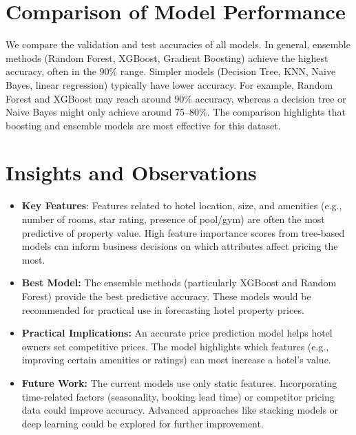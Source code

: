 \documentclass[12pt]{article}
\begin{document}
\section{Comparison of Model Performance}
We compare the validation and test accuracies of all models. In general, ensemble methods (Random Forest, XGBoost, Gradient Boosting) achieve the highest accuracy, often in the 90\% range. Simpler models (Decision Tree, KNN, Naive Bayes, linear regression) typically have lower accuracy. For example, Random Forest and XGBoost may reach around 90\% accuracy, whereas a decision tree or Naive Bayes might only achieve around 75--80\%. The comparison highlights that boosting and ensemble models are most effective for this dataset.


\section{Insights and Observations}
\begin{itemize}
    \item \textbf{Key Features}: Features related to hotel location, size, and amenities (e.g., number of rooms, star rating, presence of pool/gym) are often the most predictive of property value. High feature importance scores from tree-based models can inform business decisions on which attributes affect pricing the most.
    \item \textbf{Best Model:} The ensemble methods (particularly XGBoost and Random Forest) provide the best predictive accuracy. These models would be recommended for practical use in forecasting hotel property prices.
    \item \textbf{Practical Implications:} An accurate price prediction model helps hotel owners set competitive prices. The model highlights which features (e.g., improving certain amenities or ratings) can most increase a hotel's value.
    \item \textbf{Future Work:} The current models use only static features. Incorporating time-related factors (seasonality, booking lead time) or competitor pricing data could improve accuracy. Advanced approaches like stacking models or deep learning could be explored for further improvement.
\end{itemize}
\end{document}
